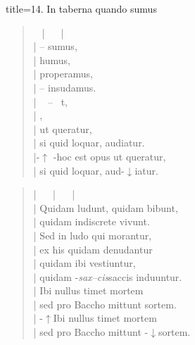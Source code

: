 \newpage
\begin{song}{title={14. In taberna quando sumus}}

\begin{verse}
  \resetmusic %

  \startline {} \wholerest ~ | ~\wholerest ~ |\\
  | --   sumus,\\
  \startline|     humus,\\
  \startline|     properamus,\\
  \startline| --  insudamus.\\
  \startline|  ~ --~ t,\\
  \startline|    ,\\
  \startline|    ut queratur,\\
  \startline| si quid loquar, audiatur.\\
  |\chord-{$\uparrow$} \chord-{}hoc est opus ut queratur,\\
  | si quid loquar, aud\chord-{$\downarrow$}iatur.
\end{verse}


\begin{verse}
  \resetmusic %
  | ~\wholerest ~ | ~\wholerest ~ |\\
  \startline| Quidam ludunt, quidam bibunt,\\
  \startline| quidam indiscrete vivunt.\\
  \startline| Sed in ludo qui morantur,\\
  \startline| ex his quidam denudantur\\
  \startline| quidam ibi vestiuntur,\\
  \startline| quidam \chord-{\emph{sax--cis}}saccis induuntur.\\
  \startline| Ibi nullus timet mortem\\
  \startline| sed pro Baccho mittunt sortem.\\
  | \chord-{$\uparrow$}Ibi nullus timet mortem\\
  \startline| sed pro Baccho mittunt \chord-{$\downarrow$}sortem.
\end{verse}


\end{song}
